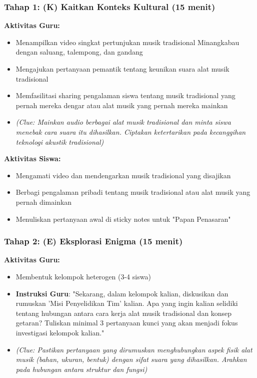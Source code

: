 \documentclass[12pt,a4paper]{article}
\begin{document}
\subsubsection{Tahap 1: (K) Kaitkan Konteks Kultural (15 menit)}

\textbf{Aktivitas Guru:}
\begin{itemize}
\item Menampilkan video singkat pertunjukan musik tradisional Minangkabau dengan saluang, talempong, dan gandang
\item Mengajukan pertanyaan pemantik tentang keunikan suara alat musik tradisional
\item Memfasilitasi sharing pengalaman siswa tentang musik tradisional yang pernah mereka dengar atau alat musik yang pernah mereka mainkan
\item \textit{(Clue: Mainkan audio berbagai alat musik tradisional dan minta siswa menebak cara suara itu dihasilkan. Ciptakan ketertarikan pada kecanggihan teknologi akustik tradisional)}
\end{itemize}

\textbf{Aktivitas Siswa:}
\begin{itemize}
\item Mengamati video dan mendengarkan musik tradisional yang disajikan
\item Berbagi pengalaman pribadi tentang musik tradisional atau alat musik yang pernah dimainkan
\item Menuliskan pertanyaan awal di sticky notes untuk "Papan Penasaran"
\end{itemize}

\subsubsection{Tahap 2: (E) Eksplorasi Enigma (15 menit)}

\textbf{Aktivitas Guru:}
\begin{itemize}
\item Membentuk kelompok heterogen (3-4 siswa)
\item \textbf{Instruksi Guru}: "Sekarang, dalam kelompok kalian, diskusikan dan rumuskan 'Misi Penyelidikan Tim' kalian. Apa yang ingin kalian selidiki tentang hubungan antara cara kerja alat musik tradisional dan konsep getaran? Tuliskan minimal 3 pertanyaan kunci yang akan menjadi fokus investigasi kelompok kalian."
\item \textit{(Clue: Pastikan pertanyaan yang dirumuskan menghubungkan aspek fisik alat musik (bahan, ukuran, bentuk) dengan sifat suara yang dihasilkan. Arahkan pada hubungan antara struktur dan fungsi)}
\end{itemize}
\end{document}
